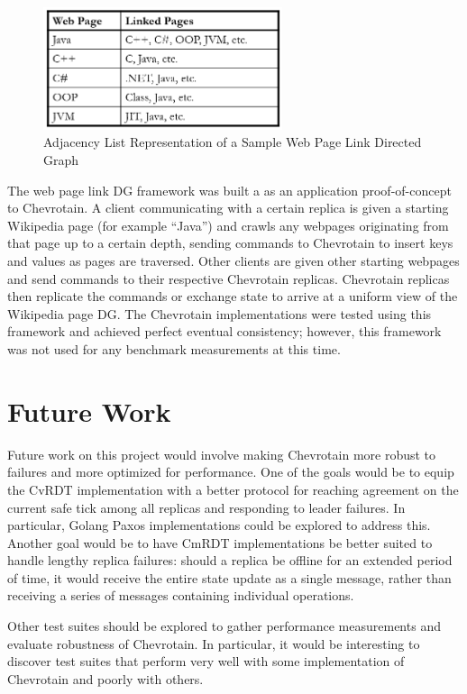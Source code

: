 \documentclass[sigconf,nonacm,11pt]{acmart}
\begin{document}
\begin{figure}[h]
  \centering
  \includegraphics[width=7cm]{Fig12Wiki2}
  \caption{Adjacency List Representation of a Sample Web Page Link Directed Graph}
  \label{fig:wiki2}
\end{figure}

The web page link DG framework was built a as an application proof-of-concept to Chevrotain. A client communicating with a certain replica is given a starting Wikipedia page (for example ``Java'') and crawls any webpages originating from that page up to a certain depth, sending commands to Chevrotain to insert keys and values as pages are traversed. Other clients are given other starting webpages and send commands to their respective Chevrotain replicas. Chevrotain replicas then replicate the commands or exchange state to arrive at a uniform view of the Wikipedia page DG. The Chevrotain implementations were tested using this framework and achieved perfect eventual consistency; however, this framework was not used for any benchmark measurements at this time.

\section{Future Work}
Future work on this project would involve making Chevrotain more robust to failures and more optimized for performance. One of the goals would be to equip the CvRDT implementation with a better protocol for reaching agreement on the current safe tick among all replicas and responding to leader failures. In particular, Golang Paxos implementations \cite{paxos} could be explored to address this. Another goal would be to have CmRDT implementations be better suited to handle lengthy replica failures: should a replica be offline for an extended period of time, it would receive the entire state update as a single message, rather than receiving a series of messages containing individual operations.

Other test suites should be explored to gather performance measurements and evaluate robustness of Chevrotain. In particular, it would be interesting to discover test suites that perform very well with some implementation of Chevrotain and poorly with others.
\end{document}
